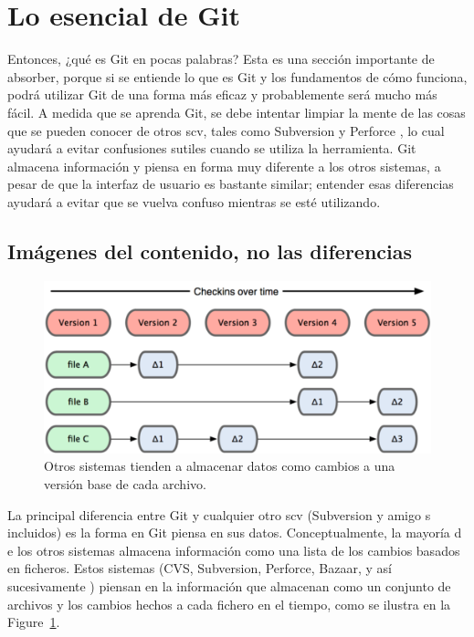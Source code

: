\documentclass[12pt, spanish, oneside, onecolumn, a4paper]{report}
\begin{document}
\section{Lo esencial de Git} 
\label{sec:gitbasics} Entonces, ¿qué es Git en pocas palabras? Esta es una sección importante de absorber, porque si se entiende lo que es Git y los fundamentos de cómo funciona, podrá utilizar Git de una forma más eficaz y probablemente será mucho más fácil. A medida que se aprenda Git, se debe intentar limpiar la mente de las cosas que se pueden conocer de otros 
\gls{scv}, tales como Subversion y Perforce , lo cual ayudará a evitar confusiones sutiles cuando se utiliza la herramienta. Git almacena información y piensa en forma muy diferente a los otros sistemas, a pesar de que la interfaz de usuario es bastante similar; entender esas diferencias ayudará a evitar que se vuelva confuso mientras se esté utilizando. 
\subsection{Imágenes del contenido, no las diferencias} 
\label{sec:snapshotsnotdifferences} 
\begin{figure} %
  \begin{center} 
    \includegraphics[width=.6\textwidth,keepaspectratio=true]{18333fig0104-tn.png} %
  \end{center} 
  \caption{Otros sistemas tienden a almacenar datos como cambios a una versión base de cada archivo.} 
  \label{otrosvcs} 
\end{figure} La principal diferencia entre Git y cualquier otro 
\gls{scv} (Subversion y amigo s incluidos) es la forma en Git piensa en sus datos. Conceptualmente, la mayoría d e los otros sistemas almacena información como una lista de los cambios basados en ficheros. Estos sistemas (CVS, Subversion, Perforce, Bazaar, y así sucesivamente ) piensan en la información que almacenan como un conjunto de archivos y los cambios hechos a cada fichero en el tiempo, como se ilustra en la Figure~\ref{otrosvcs}. 
\end{document}
